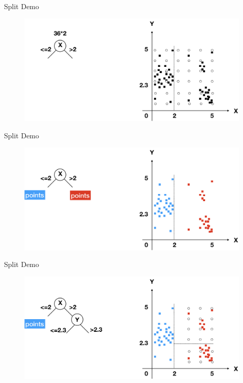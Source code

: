 \documentclass[shortpres]{beamer}
\begin{document}
      \begin{frame}{Split Demo}
          \begin{figure}
            \includegraphics[height=0.65\textheight]{fig/split0}
          \end{figure}
        \end{frame}
        \begin{frame}{Split Demo}
          \begin{figure}
            \includegraphics[height=0.65\textheight]{fig/split1}
          \end{figure}
        \end{frame}
        \begin{frame}{Split Demo}
          \begin{figure}
            \includegraphics[height=0.65\textheight]{fig/split2}
          \end{figure}
        \end{frame}
\end{document}
